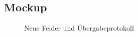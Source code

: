 \subsection{Mockup}
\label{subsec:Mockup}

\begin{figure}[htb]
\centering
{}
\caption{Neue Felder und Übergabeprotokoll}
\end{figure}

